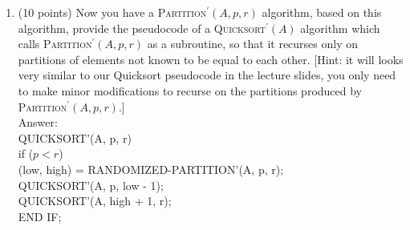 \documentclass[12pt]{article}
\begin{document}
\begin{enumerate}
\begin{enumerate}
{  }
		
	\item (10 points) Now you have a \textsc{Partition}$^\prime(A,p,r)$ algorithm, based on this algorithm, provide the pseudocode of a \textsc{Quicksort}$^\prime(A)$ algorithm which calls \textsc{Partition}$^\prime(A,p,r)$ as a subroutine, so that it recurses only on partitions of elements not known to be equal to each other. [Hint: it will looks very similar to our Quicksort pseudocode in the lecture slides, you only need to make minor modifications to recurse on the partitions produced by \textsc{Partition}$^\prime(A,p,r)$.]
	 \\ {\color{blue}Answer:	
	 \\ QUICKSORT'(A, p, r)
     \\  if ($p < r$)
     \\  (low, high) = RANDOMIZED-PARTITION'(A, p, r);
      \\  QUICKSORT'(A, p, low - 1);
      \\  QUICKSORT'(A, high + 1, r);
      \\END IF;
	 }

	\end{enumerate}
	
	
	
	

\end{enumerate}
\end{document}

